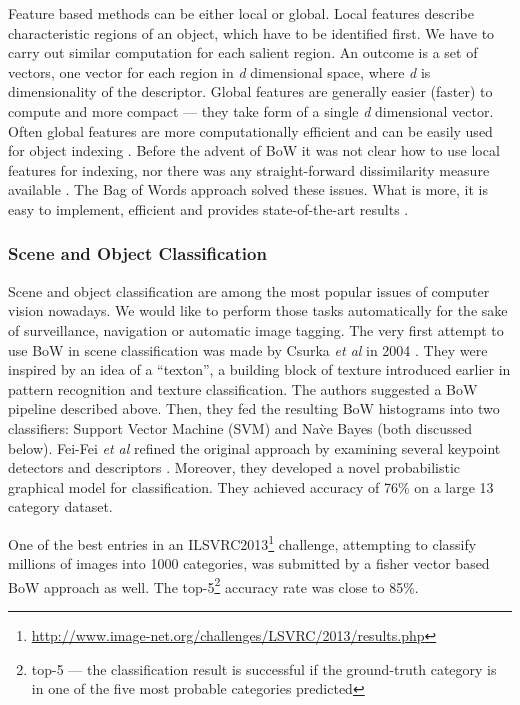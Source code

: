 \documentclass[11pt,twoside]{article}
\begin{document}
    Feature based methods can be either local or global. Local features describe characteristic regions of an object, which have to be identified first. We have to carry out similar computation for each salient region. An outcome is a set of vectors, one vector for each region in \emph{d} dimensional space, where \emph{d} is dimensionality of the descriptor. Global features are generally easier (faster) to compute and more compact --- they take form of a single \emph{d} dimensional vector. Often global features are more computationally efficient and can be easily used for object indexing . Before the advent of BoW it was not clear how to use local features for indexing, nor there was any straight-forward dissimilarity measure available \cite{tangelder2008survey}. The Bag of Words approach solved these issues. What is more, it is easy to implement, efficient and provides state-of-the-art results \cite{li2010investigating}.
    
  \subsubsection{Scene and Object Classification}
    Scene and object classification are among the most popular issues of computer vision nowadays. We would like to perform those tasks automatically for the sake of surveillance, navigation or automatic image tagging. The very first attempt to use BoW in scene classification was made by Csurka \textit{et al} in 2004 \cite{csurka2004visual}. They were inspired by an idea of a ``texton'', a building block of texture introduced earlier in pattern recognition and texture classification. The authors suggested a BoW pipeline described above. Then, they fed the resulting BoW histograms into two classifiers: Support Vector Machine (SVM) and Na\`ve Bayes (both discussed below). Fei-Fei \emph{et al} refined the original approach by examining several keypoint detectors and descriptors \cite{fei2005bayesian}. Moreover, they developed a novel probabilistic graphical model for classification. They achieved accuracy of 76\% on a large 13 category dataset. 
    
    One of the best entries in an ILSVRC2013\footnote{\url{http://www.image-net.org/challenges/LSVRC/2013/results.php}} challenge, attempting to classify millions of images into 1000 categories, was submitted by a fisher vector based BoW approach as well. The top-5\footnote{top-5 --- the classification result is successful if the ground-truth category is in one of the five most probable categories predicted} accuracy rate was close to 85\%.
	      
\end{document}
